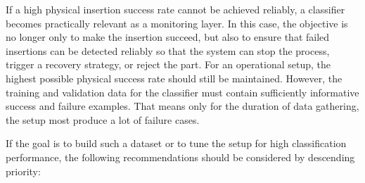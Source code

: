 If a high physical insertion success rate cannot be achieved reliably, a classifier becomes practically relevant as a monitoring layer. In this case, the objective is no longer only to make the insertion succeed, but also to ensure that failed insertions can be detected reliably so that the system can stop the process, trigger a recovery strategy, or reject the part. For an operational setup, the highest possible physical success rate should still be maintained. However, the training and validation data for the classifier must contain sufficiently informative success and failure examples. That means only for the duration of data gathering, the setup most produce a lot of failure cases.

If the goal is to build such a dataset or to tune the setup for high classification performance, the following recommendations should be considered by descending priority:
